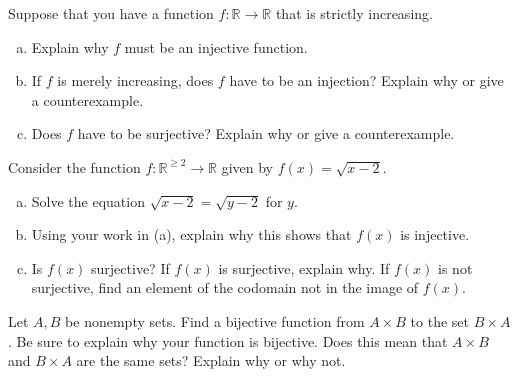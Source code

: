 \documentclass[11pt,letterpaper]{article}
\begin{document}

 Suppose that you have a function $f: \mathbb{R} \to \mathbb{R}$ that is strictly increasing. 
	\begin{enumerate}[(a)]
	\item Explain why $f$ must be an injective function. 
	\item If $f$ is merely increasing, does $f$ have to be an injection? Explain why or give a counterexample. 
	\item Does $f$ have to be surjective? Explain why or give a counterexample. 
	\end{enumerate}



\newpage



 Consider the function $f: \mathbb{R}^{\geq 2} \to \mathbb{R}$ given by $f(x)= \sqrt{x - 2}$.
	\begin{enumerate}[(a)]
	\item Solve the equation $\sqrt{x - 2}= \sqrt{y - 2}$ for $y$. 
	\item Using your work in (a), explain why this shows that $f(x)$ is injective. 
	\item Is $f(x)$ surjective? If $f(x)$ is surjective, explain why. If $f(x)$ is not surjective, find an element of the codomain not in the image of $f(x)$. 
	\end{enumerate}



\newpage



 Let $A, B$ be nonempty sets. Find a bijective function from $A \times B$ to the set $B \times A$. Be sure to explain why your function is bijective. Does this mean that $A \times B$ and $B \times A$ are the same sets? Explain why or why not. 
\end{document}
